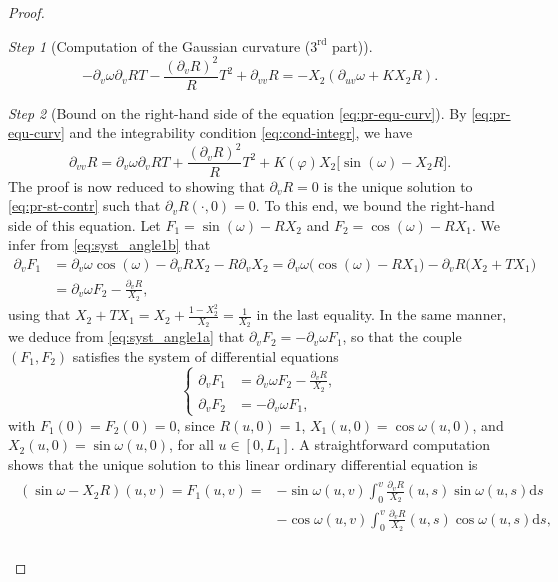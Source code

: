 \documentclass{article}
\newcommand{\DUV}{\partial_{uv}}
\newcommand{\DVV}{\partial_{vv}}
\newcommand{\DV}{\partial_{v}}
\newcommand{\ds}{\mathrm{d}s}
\theoremstyle{remark}
\theoremstyle{prpart}
\newtheorem{proofpart}{Step}
\begin{document}
\begin{proof}
\begin{proofpart}[Computation of the Gaussian curvature ($3^{\text{rd}}$ part)]
\begin{equation}
\label{eq:pr-equ-curv}
-\DV\omega \DV RT  -\frac{(\DV R)^2}{R}T^2 + \DVV R = -X_2(\DUV\omega+KX_2R).
\end{equation}
\end{proofpart}
\begin{proofpart}[Bound on the right-hand side of the equation \eqref{eq:pr-equ-curv}] \label{step:bound-sec-mem}
By \eqref{eq:pr-equ-curv} and the integrability condition \eqref{eq:cond-integr}, we have
\begin{equation}\label{eq:pr-st-contr}
\DVV R = \DV\omega \DV RT  + \frac{(\DV R)^2}{R}T^2 + K(\varphi)X_2\big[\sin(\omega)-X_2R\big].
\end{equation}
The proof is now reduced to showing that $\DV R=0$ is the unique solution to \eqref{eq:pr-st-contr} such that $\DV R(\cdot,0)=0$. To this end, we bound the right-hand side of this equation. Let $F_1 = \sin(\omega)-RX_2$ and $F_2 = \cos(\omega)-RX_1$. We infer from \eqref{eq:syst_angle1b} that
\begin{align*}
\DV F_{1} &= \DV \omega\cos(\omega) - \DV RX_2 - R\DV X_{2}= \DV\omega\big(\cos(\omega) - RX_1\big) - \DV R\big(X_2+TX_1\big)\\
&=\DV\omega F_2-\frac{\DV R}{X_2},
\end{align*}
using that $X_2+TX_1=X_2+\frac{1-X_2^2}{X_2}=\frac{1}{X_2}$ in the last equality. In the same manner, we deduce from \eqref{eq:syst_angle1a} that $\DV F_{2} = -\DV\omega F_1$, so that the couple $(F_1,F_2)$ satisfies the system of differential equations
\begin{equation*}
\left\{
\begin{split}
\DV F_{1}&=\DV\omega F_2 -\frac{\DV R}{X_2},\\
\DV F_{2} &=-\DV\omega F_1,
\end{split}
\right.
\end{equation*}
with $F_1(0) = F_2(0) = 0$, since $R(u,0) = 1$, $X_1(u,0) = \cos\omega(u,0)$, and $X_2(u,0) = \sin\omega(u,0)$, for all $u\in[0,L_1]$. A straightforward computation shows that the unique solution to this linear ordinary differential equation is 
\begin{subequations}\label{eq:ode}
\begin{align}\label{eq:ode1}
\begin{split}
(\sin \omega - X_2R)(u,v) = F_1(u,v) =&  -\sin\omega(u,v)\int_0^v\frac{\DV R}{X_2}(u,s)\sin\omega(u,s)\ds\\
&-\cos\omega(u,v)\int_0^v\frac{\DV R}{X_2}(u,s)\cos\omega(u,s)\ds,
\end{split}\\\label{eq:ode2}

\end{align}
\end{subequations}
\end{proofpart}
\end{proof}
\end{document}
